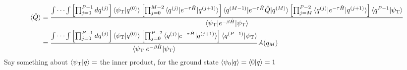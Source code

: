 \documentclass[12pt,letterpaper,oneside,final,titlepage]{article}               %
\numberwithin{equation}{section} %
\newcommand{\psiT}{\psi_{\textrm{T}}}
\newcommand{\eBH}{e^{-\beta\hat{H}}}
\newcommand{\eTH}{e^{-\tau\hat{H}}}
\begin{document}
\begin{align}
	\braket{\hat{Q}} 
		&=\frac{\int\cdots\int\left[\prod_{j=0}^{P-1}dq^{(j)}\right]
                \braket{\psiT|q^{(0)}}
				\left[\prod_{j=0}^{M-2}\braket{q^{(j)}|\eTH|q^{(j+1)}}\right]
				\braket{q^{(M-1)}|\eTH\hat{Q}|q^{(M)}}
				\left[\prod_{j=M}^{P-2}\braket{q^{(j)}|\eTH|q^{(j+1)}}\right]
                \braket{q^{P-1}|\psiT}
				}
			   {\braket{\psiT|\eBH|\psiT}}
	\\  &=\frac{\int\cdots\int\left[\prod_{j=0}^{P-1}dq^{(j)}\right]
                \braket{\psiT|q^{(0)}}
				\left[\prod_{j=0}^{P-2}\braket{q^{(j)}|\eTH|q^{(j+1)}}\right]
				\braket{q^{(P-1)}|\psiT}
				}
			   {\braket{\psiT|\eBH|\psiT}}A(q_{M})
\end{align}
Say something about $\braket{\psiT|q} =$ the inner product, for the ground state $\braket{\psi_{0}|q} = \braket{0|q} = 1$
\end{document}
